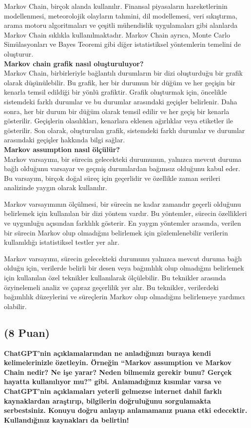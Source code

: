 \documentclass[11pt]{article}
\begin{document}
Markov Chain, birçok alanda kullanılır. Finansal piyasaların hareketlerinin modellenmesi, meteorolojik olayların tahmini, dil modellemesi, veri sıkıştırma, arama motoru algoritmaları ve çeşitli mühendislik uygulamaları gibi alanlarda Markov Chain sıklıkla kullanılmaktadır. Markov Chain ayrıca, Monte Carlo Simülasyonları ve Bayes Teoremi gibi diğer istatistiksel yöntemlerin temelini de oluşturur.\\
\textbf{Markov chain grafik nasıl oluşturuluyor?}\\
Markov Chain, birbirleriyle bağlantılı durumların bir dizi oluşturduğu bir grafik olarak düşünülebilir. Bu grafik, her bir durumun bir düğüm ve her geçişin bir kenarla temsil edildiği bir yönlü grafiktir. Grafik oluşturmak için, öncelikle sistemdeki farklı durumlar ve bu durumlar arasındaki geçişler belirlenir. Daha sonra, her bir durum bir düğüm olarak temsil edilir ve her geçiş bir kenarla gösterilir. Geçişlerin olasılıkları, kenarlara eklenen ağırlıklar veya etiketler ile gösterilir. Son olarak, oluşturulan grafik, sistemdeki farklı durumlar ve durumlar arasındaki geçişler hakkında bilgi sağlar.\\
\textbf{Markov assumption nasıl ölçülür?}\\
Markov varsayımı, bir sürecin gelecekteki durumunun, yalnızca mevcut duruma bağlı olduğunu varsayar ve geçmiş durumlardan bağımsız olduğunu kabul eder. Bu varsayım, birçok doğal süreç için geçerlidir ve özellikle zaman serileri analizinde yaygın olarak kullanılır.

Markov varsayımının ölçülmesi, bir sürecin ne kadar zamandır geçerli olduğunu belirlemek için kullanılan bir dizi yöntem vardır. Bu yöntemler, sürecin özellikleri ve uygunluğu açısından farklılık gösterir. En yaygın yöntemler arasında, verilen bir sürecin Markov olup olmadığını belirlemek için gözlemlenebilir verilerin kullanıldığı istatistiksel testler yer alır.

Markov varsayımı, sürecin gelecekteki durumunu yalnızca mevcut duruma bağlı olduğu için, verilerde belirli bir desen veya bağımlılık olup olmadığını belirlemek için kullanılan özel teknikler kullanılarak ölçülebilir. Bu teknikler arasında özyinelemeli analiz ve çapraz geçerlilik yer alır. Bu teknikler, verilerdeki bağımlılık düzeylerini ve süreçlerin Markov olup olmadığını belirlemeye yardımcı olabilir.
\subsection{(8 Puan)} \textbf{ChatGPT’nin açıklamalarından ne anladığınızı buraya kendi kelimelerinizle özetleyin. Örneğin ``Markov assumption ve Markov Chain nedir? Ne işe yarar? Neden bilmemiz gerekir bunu? Gerçek hayatta kullanılıyor mu?'' gibi. Anlamadığınız kısımlar varsa ve ChatGPT’nin açıklamaları yeterli gelmezse internet dahil farklı kaynaklardan araştırıp, bilgilerin doğruluğunu sorgulamakta serbestsiniz. Konuyu doğru anlayıp anlamamanız puana etki edecektir. Kullandığınız kaynakları da belirtin!}
\end{document}
